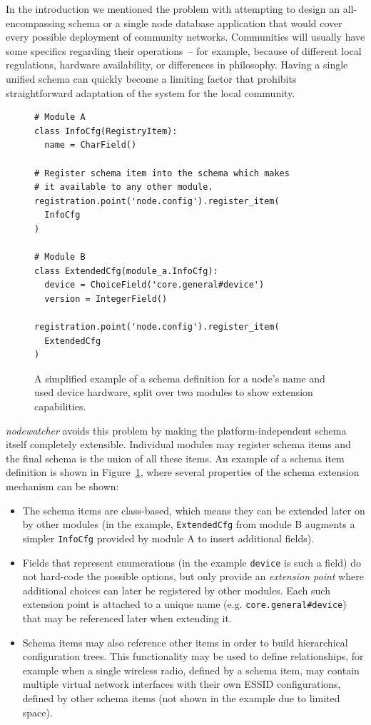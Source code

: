 \documentclass[5p,sort&compress]{elsarticle}
\newcommand{\nodewatcher}{\textit{nodewatcher}}
\begin{document}
In the introduction we mentioned the problem with attempting to design an all-encompassing schema or a single node database application that would cover every possible deployment of community networks.
Communities will usually have some specifics regarding their operations~-- for example, because of different local regulations, hardware availability, or differences in philosophy.
Having a single unified schema can quickly become a limiting factor that prohibits straightforward adaptation of the system for the local community.

\begin{figure}
\centering
\begin{verbatim}
# Module A
class InfoCfg(RegistryItem):
  name = CharField()

# Register schema item into the schema which makes
# it available to any other module.
registration.point('node.config').register_item(
  InfoCfg
)

# Module B
class ExtendedCfg(module_a.InfoCfg):
  device = ChoiceField('core.general#device')
  version = IntegerField()

registration.point('node.config').register_item(
  ExtendedCfg
)
\end{verbatim}
\caption{A simplified example of a schema definition for a node's name and used device hardware, split over two modules to show extension capabilities.}
\label{fig:schema-node-general}
\end{figure}

\nodewatcher{} avoids this problem by making the platform-independent schema itself completely extensible.
Individual modules may register schema items and the final schema is the union of all these items.
An example of a schema item definition is shown in Figure~\ref{fig:schema-node-general}, where several properties of the schema extension mechanism can be shown:
\begin{itemize}
    \item The schema items are class-based, which means they can be extended later on by other modules (in the example, \texttt{ExtendedCfg} from module B augments a simpler \texttt{InfoCfg} provided by module A to insert additional fields).
    \item Fields that represent enumerations (in the example \texttt{device} is such a field) do not hard-code the possible options, but only provide an \textit{extension point} where additional choices can later be registered by other modules.
    Each such extension point is attached to a unique name (e.g. \texttt{core.general\#device}) that may be referenced later when extending it.
    \item Schema items may also reference other items in order to build hierarchical configuration trees. This functionality may be used to define relationships, for example when a single wireless radio, defined by a schema item, may contain multiple virtual network interfaces with their own ESSID configurations, defined by other schema items (not shown in the example due to limited space).
\end{itemize}
\end{document}
